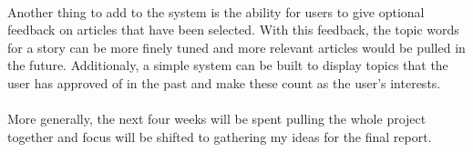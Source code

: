 \documentclass[11pt]{article}
\begin{document}
\paragraph{}
Another thing to add to the system is the ability for users to give optional feedback on articles that have been selected. With this feedback, the topic words for a story can be more finely tuned and more relevant articles would be pulled in the future. Additionaly, a simple system can be built to display topics that the user has approved of in the past and make these count as the user's interests.
\paragraph{}
More generally, the next four weeks will be spent pulling the whole project together and focus will be shifted to gathering my ideas for the final report.
\end{document}
